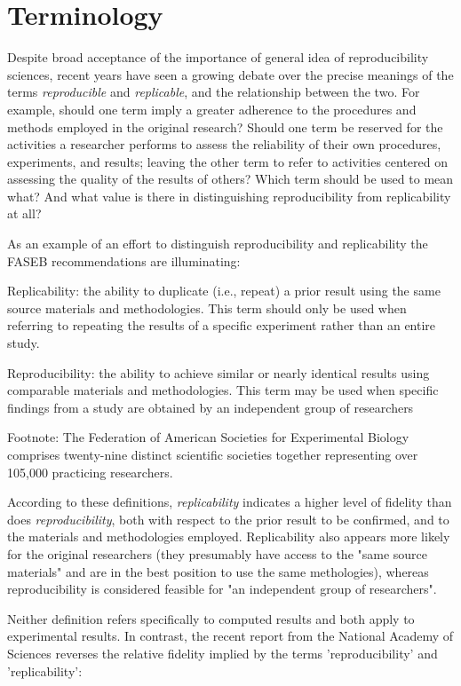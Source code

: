 \section{Terminology}

Despite broad acceptance of the importance of general idea of reproducibility sciences, 
	recent years have seen a growing debate over the precise meanings of the terms
	\emph{reproducible} and \emph{replicable}, and the relationship between the two.
For example, should one term imply a greater adherence to the procedures and methods employed
	in the original research?
Should one term be reserved for the activities a researcher performs to assess the reliability of their own procedures, 
	experiments, and results; leaving the other term to refer to activities centered on assessing the quality of 
	the results of others?  
Which term should be used to mean what? And what value is there in distinguishing reproducibility from replicability
	at all?

As an example of an effort to distinguish reproducibility and replicability the FASEB recommendations are illuminating:

	Replicability: the ability to duplicate (i.e., repeat) a prior result using the same
	source materials and methodologies. This term should only be used when
	referring to repeating the results of a specific experiment rather than an
	entire study.

	Reproducibility: the ability to achieve similar or nearly identical results using comparable materials and methodologies. 
	This term may be used when specific findings from a study are obtained by an independent group of researchers

Footnote: The Federation of American Societies for Experimental Biology comprises twenty-nine distinct scientific 
	societies together representing over 105,000 practicing researchers.

According to these definitions, \emph{replicability} indicates a higher level of fidelity than does \emph{reproducibility}, 
	both with respect to the prior result to be confirmed, and to the materials and methodologies employed.
Replicability also appears more likely for the original researchers (they presumably have access to the "same source materials"
	and are in the best position to use the same methologies), whereas reproducibility is considered feasible for
	"an independent group of researchers". 



Neither definition refers specifically to computed results and both apply to experimental results.  In contrast, the recent report from the National
	Academy of Sciences reverses the relative fidelity implied by the terms 'reproducibility' and 'replicability':

